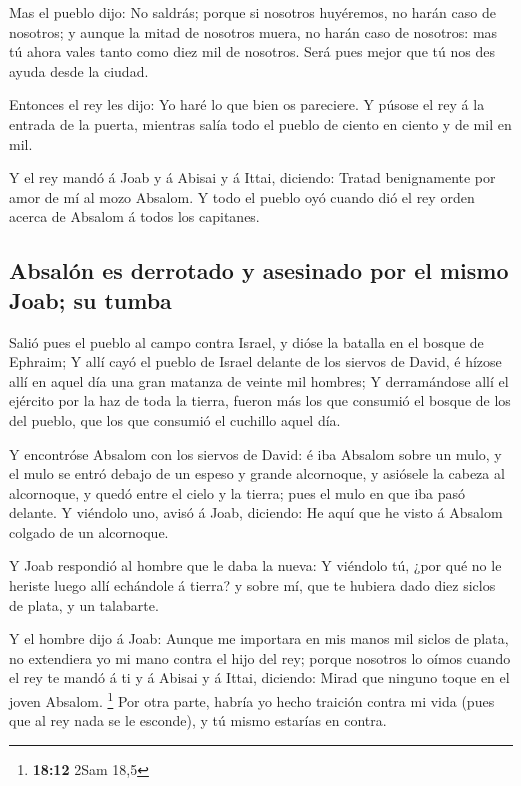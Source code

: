  Mas el pueblo dijo: No saldrás; porque si nosotros
huyéremos, no harán caso de nosotros; y aunque la mitad de nosotros
muera, no harán caso de nosotros: mas tú ahora vales tanto como diez mil
de nosotros. Será pues mejor que tú nos des ayuda desde la ciudad.

 Entonces el rey les dijo: Yo haré lo que bien os pareciere.
Y púsose el rey á la entrada de la puerta, mientras salía todo el pueblo
de ciento en ciento y de mil en mil.

 Y el rey mandó á Joab y á Abisai y á Ittai, diciendo:
Tratad benignamente por amor de mí al mozo Absalom. Y todo el pueblo oyó
cuando dió el rey orden acerca de Absalom á todos los capitanes.

\hypertarget{absaluxf3n-es-derrotado-y-asesinado-por-el-mismo-joab-su-tumba}{%
\subsection{Absalón es derrotado y asesinado por el mismo Joab; su
tumba}\label{absaluxf3n-es-derrotado-y-asesinado-por-el-mismo-joab-su-tumba}}

 Salió pues el pueblo al campo contra Israel, y dióse la
batalla en el bosque de Ephraim;  Y allí cayó el pueblo de
Israel delante de los siervos de David, é hízose allí en aquel día una
gran matanza de veinte mil hombres;  Y derramándose allí el
ejército por la haz de toda la tierra, fueron más los que consumió el
bosque de los del pueblo, que los que consumió el cuchillo aquel día.

 Y encontróse Absalom con los siervos de David: é iba
Absalom sobre un mulo, y el mulo se entró debajo de un espeso y grande
alcornoque, y asiósele la cabeza al alcornoque, y quedó entre el cielo y
la tierra; pues el mulo en que iba pasó delante.  Y
viéndolo uno, avisó á Joab, diciendo: He aquí que he visto á Absalom
colgado de un alcornoque.

 Y Joab respondió al hombre que le daba la nueva: Y
viéndolo tú, ¿por qué no le heriste luego allí echándole á tierra? y
sobre mí, que te hubiera dado diez siclos de plata, y un talabarte.

 Y el hombre dijo á Joab: Aunque me importara en mis manos
mil siclos de plata, no extendiera yo mi mano contra el hijo del rey;
porque nosotros lo oímos cuando el rey te mandó á ti y á Abisai y á
Ittai, diciendo: Mirad que ninguno toque en el joven Absalom.
\footnote{\textbf{18:12} 2Sam 18,5}  Por otra parte, habría
yo hecho traición contra mi vida (pues que al rey nada se le esconde), y
tú mismo estarías en contra.

